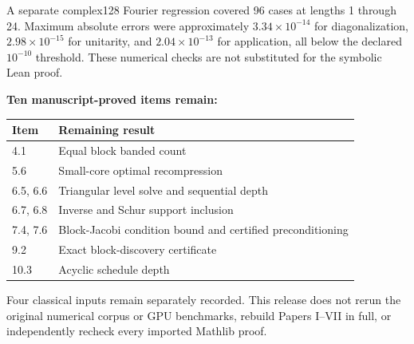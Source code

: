 A separate complex128 Fourier regression covered 96 cases at lengths 1 through 24. Maximum absolute errors were approximately $3.34\times10^{-14}$ for diagonalization, $2.98\times10^{-15}$ for unitarity, and $2.04\times10^{-13}$ for application, all below the declared $10^{-10}$ threshold. These numerical checks are not substituted for the symbolic Lean proof.

\textbf{Ten manuscript-proved items remain:}
\begin{center}\small
\begin{tabular}{@{}lp{}@{}}
\toprule
Item & Remaining result\\\midrule
4.1 & Equal block banded count\\
5.6 & Small-core optimal recompression\\
6.5, 6.6 & Triangular level solve and sequential depth\\
6.7, 6.8 & Inverse and Schur support inclusion\\
7.4, 7.6 & Block-Jacobi condition bound and certified preconditioning\\
9.2 & Exact block-discovery certificate\\
10.3 & Acyclic schedule depth\\\bottomrule
\end{tabular}
\end{center}
Four classical inputs remain separately recorded. This release does not rerun the original numerical corpus or GPU benchmarks, rebuild Papers I--VII in full, or independently recheck every imported Mathlib proof.

